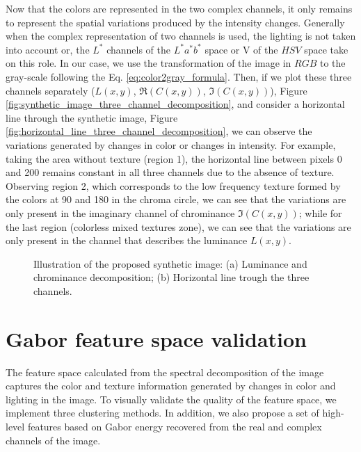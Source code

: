 Now that the colors are represented in the two complex channels, it only remains to represent the spatial variations produced by the intensity changes. Generally when the complex representation of two channels is used, the lighting is not taken into account or, the $L^*$ channels of the $L^*a^*b^*$ space or V of the $HSV$ space take on this role. In our case, we use the transformation of the image in $RGB$ to the gray-scale following the Eq. \eqref{eq:color2gray_formula}. Then, if we plot these three channels separately ($L(x,y)$, $\Re(C(x,y))$, $\Im(C(x,y))$), Figure \ref{fig:synthetic_image_three_channel_decomposition}, and consider a horizontal line through the synthetic image, Figure \ref{fig:horizontal_line_three_channel_decomposition}, we can observe the variations generated by changes in color or changes in intensity. For example, taking the area without texture (region 1), the horizontal line between pixels 0 and 200 remains constant in all three channels due to the absence of texture. Observing region 2, which corresponds to the low frequency texture formed by the colors at 90 and 180 in the chroma circle, we can see that the variations are only present in the imaginary channel of chrominance $\Im(C(x,y))$; while for the last region (colorless mixed textures zone), we can see that the variations are only present in the channel that describes the luminance $L(x,y)$.

\begin{figure}
\centering
\caption{Illustration of the proposed synthetic image: (a) Luminance and chrominance decomposition; (b) Horizontal line trough the three channels.}\label{fig:three_channel_decomposition}
\end{figure}

\section{Gabor feature space validation}
The feature space calculated from the spectral decomposition of the image captures the color and texture information generated by changes in color and lighting in the image. To visually validate the quality of the feature space, we implement three clustering methods. In addition, we also propose a set of high-level features based on Gabor energy recovered from the real and complex channels of the image.

